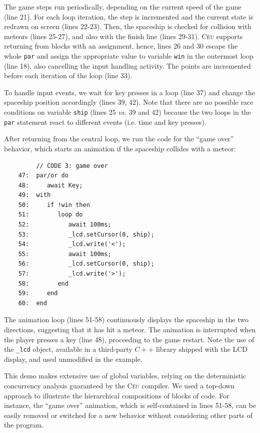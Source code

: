\documentclass{sig-alternate}
\newcommand{\2}{\;\;}
\newcommand{\5}{\;\;\;\;\;}
\newcommand{\CEU}{\textsc{C\'{e}u}}
\newcommand{\code}[1] {{\small{\texttt{#1}}}}
\begin{document}
The game steps run periodically, depending on the current speed of the game 
(line 21).
For each loop iteration, the step is incremented and the current state is 
redrawn on screen (lines 22-23).
Then, the spaceship is checked for collision with meteors (lines 25-27), and 
also with the finish line (lines 29-31).
\CEU{} supports returning from blocks with an assignment, hence, lines 26 and 
30 escape the whole \code{par} and assign the appropriate value to variable 
\code{win} in the outermost loop (line 18), also cancelling the input handling 
activity.
The points are incremented before each iteration of the loop (line 33).

To handle input events, we wait for key presses in a loop (line 37) and change 
the spaceship position accordingly (lines 39, 42).
Note that there are no possible race conditions on variable \code{ship} (lines 
25 \emph{vs.} 39 and 42) because the two loops in the \code{par} statement 
react to different events (i.e. time and key presses).

After returning from the central loop, we run the code for the ``game over'' 
behavior, which starts an animation if the spaceship collides with a meteor:

{\small
\begin{verbatim}
         // CODE 3: game over
    47:  par/or do
    48:     await Key;
    49:  with
    50:     if !win then
    51:        loop do
    52:           await 100ms;
    53:           _lcd.setCursor(0, ship);
    54:           _lcd.write('<');
    55:           await 100ms;
    56:           _lcd.setCursor(0, ship);
    57:           _lcd.write('>');
    58:        end
    59:     end
    60:  end
\end{verbatim}
}

The animation loop (lines 51-58) continuously displays the spaceship in the two 
directions, suggesting that it has hit a meteor.
The animation is interrupted when the player presses a key (line 48), 
proceeding to the game restart.
Note the use of the \code{\_lcd} object, available in a third-party $C++$ 
library shipped with the LCD display, and used unmodified in the example.

This demo makes extensive use of global variables, relying on the
deterministic concurrency analysis guaranteed by the \CEU{} compiler.
We used a top-down approach to illustrate the hierarchical compositions of 
blocks of code.
For instance, the ``game over'' animation, which is self-contained in lines 
51-58, can be easily removed or switched for a new behavior without considering 
other parts of the program.
\end{document}
